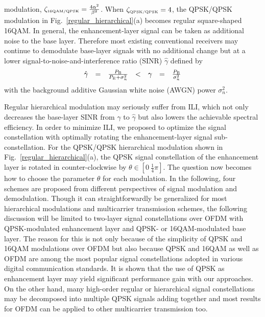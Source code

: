 \documentclass[conference]{IEEEtran}
\begin{document}
modulation, $\zeta_{\mbox{\tiny 16QAM/QPSK}}=
\frac{4\alpha^{2}}{\beta^{2}}$. When $\zeta_{\mbox{\tiny
QPSK/QPSK}}=4$, the QPSK/QPSK modulation in
Fig.~\ref{regular_hierarchical}(a) becomes regular square-shaped
16QAM. In general, the enhancement-layer signal can be taken as
additional noise to the base layer. Therefore most existing
conventional receivers may continue to demodulate base-layer
signals with no additional change but at a lower
signal-to-noise-and-interference ratio (SINR) $\hat{\gamma}$
defined by
\begin{equation}
\begin{array}{rcccccl}
\hat{\gamma}& = & \frac{P_{\mbox{\tiny B}}}{P_{\mbox{\tiny
E}}+\sigma_{n}^{2}}&<&\gamma&=&\frac{P_{\mbox{\tiny
B}}}{\sigma_{n}^{2}}
\end{array}\label{SINR}
\end{equation}
\noindent with the background additive Gaussian white noise (AWGN)
power $\sigma_{n}^{2}$.

Regular hierarchical modulation may seriously suffer from ILI,
which not only decreases the base-layer SINR from ${\gamma}$ to
$\hat{\gamma}$ but also lowers the achievable spectral efficiency.
In order to minimize ILI, we proposed to optimize the signal
constellation with optimally rotating the enhancement-layer signal
sub-constellation. For the QPSK/QPSK hierarchical modulation shown
in Fig.~\ref{regular_hierarchical}(a), the QPSK signal
constellation of the enhancement layer is rotated in
counter-clockwise by $\theta\in\left[0\ \frac{1}{4}\pi\right]$.
The question now becomes how to choose the parameter $\theta$ for
each modulation. In the following, four schemes are proposed from
different perspectives of signal modulation and demodulation.
Though it can straightforwardly be generalized for most
hierarchical modulations and multicarrier transmission schemes,
the following discussion will be limited to two-layer signal
constellations over OFDM with QPSK-modulated enhancement layer and
QPSK- or 16QAM-modulated base layer. The reason for this is not
only because of the simplicity of QPSK and 16QAM modulations over
OFDM but also because QPSK and 16QAM as well as OFDM are among the
most popular signal constellations adopted in various digital
communication standards. It is shown that the use of QPSK as
enhancement layer may yield significant performance gain with our
approaches. On the other hand, many high-order regular or
hierarchical signal constellations may be decomposed into multiple
QPSK signals adding together and most results for OFDM can be
applied to other multicarrier transmission too.
\end{document}
